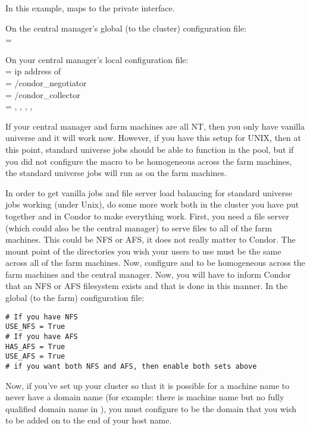 In this example,  maps to the private interface.

On the central manager's global (to the cluster) configuration file: \\
 = 

On your central manager's local configuration file: \\
 = ip address of  \\
 = /condor\_negotiator \\
 = /condor\_collector \\
 = , , , , 

If your central manager and farm machines are all NT, then you only have
vanilla universe and it will work now.  However, if you have this setup
for UNIX, then at this point, standard universe jobs should be able to
function in the pool, but if you did not configure the 
macro to be homogeneous across the farm machines, the standard universe
jobs will run as  on the farm machines.

In order to get vanilla jobs and file server load balancing for standard
universe jobs working (under Unix), do some more work both in
the cluster you have put together and in Condor to make everything work.
First, you need a file server (which could also be the central manager) to
serve files to all of the farm machines. This could be NFS or AFS, it does
not really matter to Condor. The mount point of the directories you wish
your users to use must be the same across all of the farm machines. Now,
configure  and  to be
homogeneous across the farm machines and the central manager. Now, you
will have to inform Condor that an NFS or AFS filesystem exists and that
is done in this manner. In the global (to the farm) configuration file:

\begin{verbatim}
# If you have NFS
USE_NFS = True
# If you have AFS
HAS_AFS = True
USE_AFS = True
# if you want both NFS and AFS, then enable both sets above
\end{verbatim}

Now, if you've set up your cluster so that it is possible for a machine
name to never have a domain name (for example: there is machine
name but no fully qualified domain name in ), you must
configure  to be the domain that you wish
to be added on to the end of your host name.


